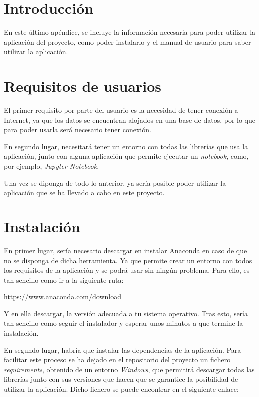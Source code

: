 
\section{Introducción}
En este último apéndice, se incluye la información necesaria para poder utilizar la aplicación del proyecto, como poder instalarlo y el manual de usuario para saber utilizar la aplicación.

\section{Requisitos de usuarios}
El primer requisito por parte del usuario es la necesidad de tener conexión a Internet, ya que los datos se encuentran alojados en una base de datos, por lo que para poder usarla será necesario tener conexión.

En segundo lugar, necesitará tener un entorno con todas las librerías que usa la aplicación, junto con alguna aplicación que permite ejecutar un \emph{notebook}, como, por ejemplo, \emph{Jupyter Notebook}.

Una vez se diponga de todo lo anterior, ya sería posible poder utilizar la aplicación que se ha llevado a cabo en este proyecto.

\section{Instalación}
En primer lugar, sería necesario descargar en instalar Anaconda en caso de que no se disponga de dicha herramienta. Ya que permite crear un entorno con todos los requisitos de la aplicación y se podrá usar sin ningún problema. Para ello, es tan sencillo como ir a la siguiente ruta:

\url{https://www.anaconda.com/download}

Y en ella descargar, la versión adecuada a tu sistema operativo. Tras esto, sería tan sencillo como seguir el instalador y esperar unos minutos a que termine la instalación.

En segundo lugar, habría que instalar las dependencias de la aplicación. Para facilitar este proceso se ha dejado en el repositorio del proyecto un fichero \emph{requirements}, obtenido de un entorno \emph{Windows}, que permitirá descargar todas las librerías junto con sus versiones que hacen que se garantice la posibilidad de utilizar la aplicación. Dicho fichero se puede encontrar en el siguiente enlace:

